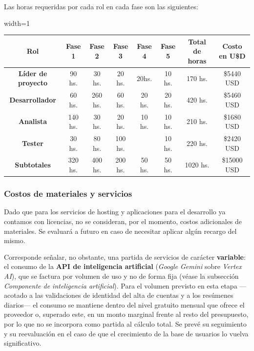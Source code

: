 \documentclass[a4paper,12pt]{article}
\newcommand{\saltolinea}{\par\vspace{\baselineskip}}
\begin{document}
    \par Las horas requeridas por cada rol en cada fase son las siguientes: \saltolinea
    \begin{center}
        \begin{adjustbox}{width=1\textwidth}
            \begin{tabular}{ |c|c|c|c|c|c|c|c| }
                \hline
                \rowcolor{lightgray} \textbf{Rol} & \textbf{Fase 1} & \textbf{Fase 2} & \textbf{Fase 3} & \textbf{Fase 4} & \textbf{Fase 5} & \textbf{Total de horas} & \textbf{Costo en U\$D} \\
                \hline    
                \cellcolor{lightgray} \textbf{Líder de proyecto} & 90 hs. & 30 hs. & 20 hs. & 20hs. & 10 hs. & \cellcolor{lightgray} 170 hs. & \cellcolor{lightgray} \$5440 USD \\
                \hline
                \cellcolor{lightgray} \textbf{Desarrollador} & 60 hs. & 260 hs. & 60 hs. & 20 hs. & 20 hs. & \cellcolor{lightgray} 420 hs. & \cellcolor{lightgray} \$5460 USD \\
                \hline
                \cellcolor{lightgray} \textbf{Analista} & 140 hs. & 30 hs. & 20 hs. & 10 hs. & 10 hs. & \cellcolor{lightgray} 210 hs. & \cellcolor{lightgray} \$1680 USD \\
                \hline
                \cellcolor{lightgray} \textbf{Tester} & 30 hs. & 80 hs. & 100 hs. &  & 10 hs. & \cellcolor{lightgray} 220 hs. & \cellcolor{lightgray} \$2420 USD \\
                \hline
                \rowcolor{lightgray} \textbf{Subtotales} & 320 hs. & 400 hs. & 200 hs. & 50 hs. & 50 hs. & 1020 hs. & \$15000 USD \\
                \hline
            \end{tabular}
        \end{adjustbox}
    \end{center}
    \subsubsection{Costos de materiales y servicios}
    \par Dado que para los servicios de hosting y aplicaciones para el desarrollo ya contamos con licencias, no se consideran, por el momento, costos adicionales de materiales. Se evaluará a futuro en caso de necesitar aplicar algún recargo del mismo.
    \par Corresponde señalar, no obstante, una partida de servicios de carácter \textbf{variable}: el consumo de la \textbf{API de inteligencia artificial} (\textit{Google Gemini} sobre \textit{Vertex AI}), que se factura por volumen de uso y no de forma fija (véase la subsección \textit{Componente de inteligencia artificial}). Para el volumen previsto en esta etapa —acotado a las validaciones de identidad del alta de cuentas y a los resúmenes diarios— el consumo se mantiene dentro del nivel gratuito mensual que ofrece el proveedor o, superado este, en un monto marginal frente al resto del presupuesto, por lo que no se incorpora como partida al cálculo total. Se prevé su seguimiento y su reevaluación en el caso de que el crecimiento de la base de usuarios lo vuelva significativo.
\end{document}
